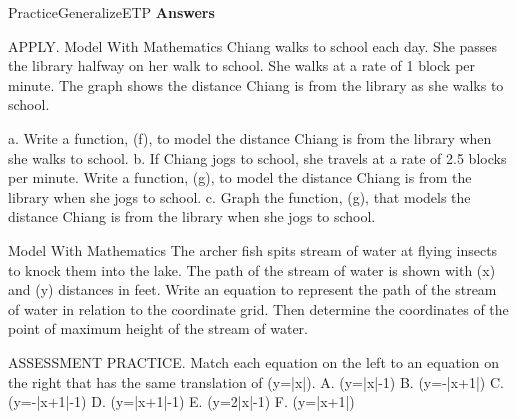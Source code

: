 \documentclass{article}
\newenvironment{practice}[2]{}{}        %
\newenvironment{te-addendum}[2]{}{}     %
\newcommand{\answer}[1]{}               %
\newcommand{\placeholder}[2]{}          %
\newcommand{\te}[1]{}                   %
\begin{document}
\begin{te-addendum}{Practice}{GeneralizeETP}
\textbf{Answers}
\te{Printed answers and graphs for Exercises 16–21 are attached to their corresponding practice blocks above. The repeated line “24–32, 34. See back of book.” is represented in those answer blocks. Practice \& Problem Solving is available at SavvasRealize.com.}
\end{te-addendum}
\begin{practice}{34}{3}
APPLY. Model With Mathematics Chiang walks to school each day. She passes the library halfway on her walk to school. She walks at a rate of 1 block per minute. The graph shows the distance Chiang is from the library as she walks to school.
\placeholder{graph}{Blue V y=|x| vertex (0,0), arrowheads upper left/right, unit grid approximately x=-5 to 5,y=-1 to 8. Horizontal x-axis labels -4,-2,2,4, left caption Minutes Before Passing Library, right caption Minutes After Passing Library. Vertical y-axis Blocks From Library, labels 2,4,6. Axes arrowed, origin O, no point circles.}
a. Write a function, (f), to model the distance Chiang is from the library when she walks to school.
b. If Chiang jogs to school, she travels at a rate of 2.5 blocks per minute. Write a function, (g), to model the distance Chiang is from the library when she jogs to school.
c. Graph the function, (g), that models the distance Chiang is from the library when she jogs to school.
\answer{See back of book.}
\end{practice}
\begin{practice}{35}{3}
Model With Mathematics The archer fish spits stream of water at flying insects to knock them into the lake. The path of the stream of water is shown with (x) and (y) distances in feet. Write an equation to represent the path of the stream of water in relation to the coordinate grid. Then determine the coordinates of the point of maximum height of the stream of water.
\placeholder{graph}{Black downward parabola through filled (0,0),(1,1),(2,0), vertex (1,1), both descending ends arrowed, over illustration of fish spitting at insect on leaf. x/y axes arrowed, origin 0, x labels 1,2, y labels -1,1; half-unit grid, window approximately x=-1 to 3,y=-1.5 to 1.5.}
\answer{(y=-(x-1)^2+1); (1,1)}
\end{practice}
\begin{practice}{36}{2}
ASSESSMENT PRACTICE. Match each equation on the left to an equation on the right that has the same translation of (y=|x|).
A. (y=|x|-1)
B. (y=-|x+1|)
C. (y=-|x+1|-1)
D. (y=|x+1|-1)
E. (y=2|x|-1)
F. (y=|x+1|)
\answer{A–E; B–F; C–D.}
\te{Matches are printed as magenta connecting lines.}
\end{practice}
\end{document}
